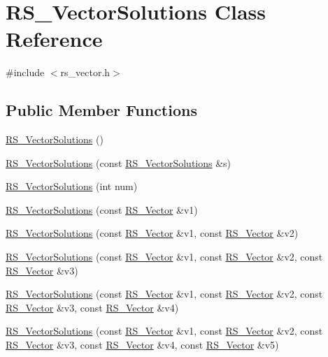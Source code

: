 \hypertarget{classRS__VectorSolutions}{\section{R\-S\-\_\-\-Vector\-Solutions Class Reference}
\label{classRS__VectorSolutions}
}


{\ttfamily \#include $<$rs\-\_\-vector.\-h$>$}

\subsection*{Public Member Functions}
\begin{DoxyCompactItemize}
\item 
\hyperlink{classRS__VectorSolutions_a240f09023e199712f456b21bd0690944}{R\-S\-\_\-\-Vector\-Solutions} ()
\item 
\hyperlink{classRS__VectorSolutions_a92d7fc857eea9c9ba96b63aefbb30268}{R\-S\-\_\-\-Vector\-Solutions} (const \hyperlink{classRS__VectorSolutions}{R\-S\-\_\-\-Vector\-Solutions} \&s)
\item 
\hyperlink{classRS__VectorSolutions_a416d9c4f0666aac9f31f6bab0ffa33d7}{R\-S\-\_\-\-Vector\-Solutions} (int num)
\item 
\hyperlink{classRS__VectorSolutions_aeba70867266eb3b1bb8718f1e1f0ad81}{R\-S\-\_\-\-Vector\-Solutions} (const \hyperlink{classRS__Vector}{R\-S\-\_\-\-Vector} \&v1)
\item 
\hyperlink{classRS__VectorSolutions_a79631e3489c4a52b61922151a011f69e}{R\-S\-\_\-\-Vector\-Solutions} (const \hyperlink{classRS__Vector}{R\-S\-\_\-\-Vector} \&v1, const \hyperlink{classRS__Vector}{R\-S\-\_\-\-Vector} \&v2)
\item 
\hyperlink{classRS__VectorSolutions_acdff387f45e63375cca5a862af1a62d2}{R\-S\-\_\-\-Vector\-Solutions} (const \hyperlink{classRS__Vector}{R\-S\-\_\-\-Vector} \&v1, const \hyperlink{classRS__Vector}{R\-S\-\_\-\-Vector} \&v2, const \hyperlink{classRS__Vector}{R\-S\-\_\-\-Vector} \&v3)
\item 
\hyperlink{classRS__VectorSolutions_a96231e5c0cba59f3cf2fc7144d8a15e1}{R\-S\-\_\-\-Vector\-Solutions} (const \hyperlink{classRS__Vector}{R\-S\-\_\-\-Vector} \&v1, const \hyperlink{classRS__Vector}{R\-S\-\_\-\-Vector} \&v2, const \hyperlink{classRS__Vector}{R\-S\-\_\-\-Vector} \&v3, const \hyperlink{classRS__Vector}{R\-S\-\_\-\-Vector} \&v4)
\item 
\hyperlink{classRS__VectorSolutions_af7bbc51fa55eb36180d79e261e9ef3f9}{R\-S\-\_\-\-Vector\-Solutions} (const \hyperlink{classRS__Vector}{R\-S\-\_\-\-Vector} \&v1, const \hyperlink{classRS__Vector}{R\-S\-\_\-\-Vector} \&v2, const \hyperlink{classRS__Vector}{R\-S\-\_\-\-Vector} \&v3, const \hyperlink{classRS__Vector}{R\-S\-\_\-\-Vector} \&v4, const \hyperlink{classRS__Vector}{R\-S\-\_\-\-Vector} \&v5)

\end{DoxyCompactItemize}
